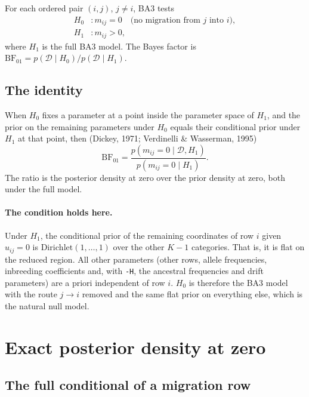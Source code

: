 \documentclass[11pt,a4paper]{article}
\newcommand{\BF}{\mathrm{BF}}
\newcommand{\data}{\mathcal{D}}
\newcommand{\Dir}{\mathrm{Dirichlet}}
\newcommand{\1}{\mathbf{1}}
\begin{document}
For each ordered pair $(i,j)$, $j\neq i$, BA3 tests
\begin{align*}
H_0&\colon m_{ij}=0 \quad\text{(no migration from } j \text{ into } i),\\
H_1&\colon m_{ij}>0,
\end{align*}
where $H_1$ is the full BA3 model. The Bayes factor is
$\BF_{01} = p(\data\mid H_0)/p(\data\mid H_1)$.

\subsection{The identity}

When $H_0$ fixes a parameter at a point inside the parameter space of $H_1$,
and the prior on the remaining parameters under $H_0$ equals their conditional
prior under $H_1$ at that point, then (Dickey, 1971; Verdinelli \& Wasserman,
1995)
\begin{equation}
\BF_{01} = \frac{p(m_{ij}=0 \mid \data, H_1)}{p(m_{ij}=0 \mid H_1)}.
\label{eq:sd}
\end{equation}
The ratio is the posterior density at zero over the prior density at zero, both
under the full model.

\paragraph{The condition holds here.}
Under $H_1$, the conditional prior of the remaining coordinates of row $i$
given $u_{ij}=0$ is $\Dir(1,\ldots,1)$ over the other $K-1$ categories. That
is, it is flat on the reduced region. All other parameters (other rows, allele
frequencies, inbreeding coefficients and, with \texttt{-H}, the ancestral
frequencies and drift parameters) are a priori independent of row $i$.
$H_0$ is therefore the BA3 model with the route $j\to i$ removed and the same
flat prior on everything else, which is the natural null model.

\section{Exact posterior density at zero}
\label{sec:exact}

\subsection{The full conditional of a migration row}
\end{document}
